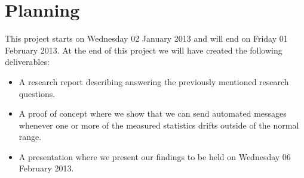 \documentclass{article}
\begin{document}
\section{Planning}
  \begin{gantt}[xunitlength=50pt]{9}{5}
    \begin{ganttitle}
    \end{ganttitle}
    \begin{ganttitle}
    \end{ganttitle}
  \end{gantt}
This project starts on Wednesday 02 January 2013 and will end on Friday 01 February 2013. 
At the end of this project we will have created the following deliverables:
\begin{itemize}
\item A research report describing answering the previously mentioned research questions.
\item A proof of concept where we show that we can send automated messages whenever one or more of the measured statistics drifts outside of the normal range.
\item A presentation where we present our findings to be held on Wednesday 06 February 2013.
\end{itemize}




\end{document}
